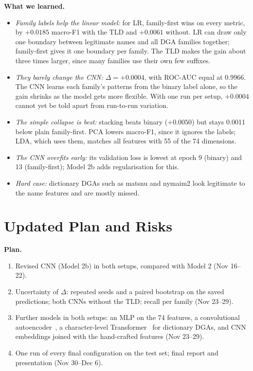 \documentclass[11pt]{article}
\begin{document}
\textbf{What we learned.}
\begin{itemize}
  \item \emph{Family labels help the linear model:} for LR, family-first wins on
  every metric, by $+0.0185$ macro-F1 with the TLD and $+0.0061$ without. LR can
  draw only one boundary between legitimate names and all DGA families together;
  family-first gives it one boundary per family. The TLD makes the gain about
  three times larger, since many families use their own few suffixes.
  \item \emph{They barely change the CNN:} $\Delta = +0.0004$, with ROC-AUC equal
  at 0.9966. The CNN learns each family's patterns from the binary label alone,
  so the gain shrinks as the model gets more flexible. With one run per setup,
  $+0.0004$ cannot yet be told apart from run-to-run variation.
  \item \emph{The simple collapse is best:} stacking beats binary ($+0.0050$) but
  stays 0.0011 below plain family-first. PCA lowers macro-F1, since it ignores the
  labels; LDA, which uses them, matches all features with 55 of the 74 dimensions.
  \item \emph{The CNN overfits early:} its validation loss is lowest at epoch 9
  (binary) and 13 (family-first); Model 2b adds regularisation for this.
  \item \emph{Hard case:} dictionary DGAs such as matsnu and nymaim2 look
  legitimate to the name features and are mostly missed.
\end{itemize}

\section{Updated Plan and Risks}
\textbf{Plan.}
\begin{enumerate}
  \item Revised CNN (Model 2b) in both setups, compared with Model 2 (Nov 16--22).
  \item Uncertainty of $\Delta$: repeated seeds and a paired bootstrap on the
  saved predictions; both CNNs without the TLD; recall per family (Nov 23--29).
  \item Further models in both setups: an MLP on the 74 features, a convolutional
  autoencoder~\cite{masci2011cae}, a character-level
  Transformer~\cite{vaswani2017attention} for dictionary DGAs, and CNN embeddings
  joined with the hand-crafted features (Nov 23--29).
  \item One run of every final configuration on the test set; final report and
  presentation (Nov 30--Dec 6).
\end{enumerate}
\end{document}
